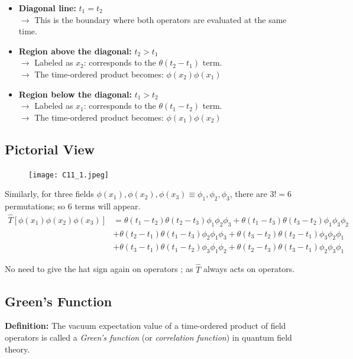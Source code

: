 \documentclass[14pt]{article} %
\begin{document}
{\begin{itemize}
    \item \textbf{Diagonal line:} $t_1 = t_2$ \\ 
    $\to$ This is the boundary where both operators are evaluated at the same time.
    \item \textbf{Region above the diagonal:} $t_2 > t_1$  \\
    $\to$ Labeled as $x_2$: corresponds to the $\theta(t_2 - t_1)$ term.  \\
    $\to$ The time-ordered product becomes: $\phi(x_2)\phi(x_1)$
    \item \textbf{Region below the diagonal:} $t_1 > t_2$  \\
    $\to$ Labeled as $x_1$: corresponds to the $\theta(t_1 - t_2)$ term. \\
    $\to$ The time-ordered product becomes: $\phi(x_1)\phi(x_2)$
\end{itemize}

\subsection*{Pictorial View}
\begin{figure}[H]
    \centering
    \texttt{[image: C11\_1.jpeg]}
    \caption*{}
\end{figure}
\vspace{-1cm}
Similarly, for three fields $\phi(x_1), \phi(x_2), \phi(x_3) \equiv\phi_1, \phi_2,\phi_3 $, there are $3! = 6$ permutations; so 6 terms will appear.
\begin{align*}
\hat{T} [\phi(x_1)\phi(x_2)\phi(x_3)] &= \theta(t_1 - t_2)\theta(t_2 - t_3) \phi_1 \phi_2 \phi_3+ \theta(t_1 - t_3)\theta(t_3 - t_2) \phi_1 \phi_3 \phi_2 \\
& + \theta(t_2 - t_1)\theta(t_1 - t_3) \phi_2 \phi_1 \phi_3 + \theta(t_3 - t_2)\theta(t_2 - t_1) \phi_3\phi_2 \phi_1 \\
& + \theta(t_3 - t_1)\theta(t_1 - t_2) \phi_3 \phi_1 \phi_2 + 
\theta(t_2 - t_3)\theta(t_3 - t_1) \phi_2 \phi_3 \phi_1
\end{align*}
\begin{tcolorbox}
No need to give the hat sign again on operators ; as $\hat{T}$ always acts on operators.
\end{tcolorbox}

\subsection{Green's Function}
\textbf{Definition:} The vacuum expectation value of a time-ordered product of field operators is called a \textit{Green's function} (or \textit{correlation function}) in quantum field theory.\\

}
\end{document}
